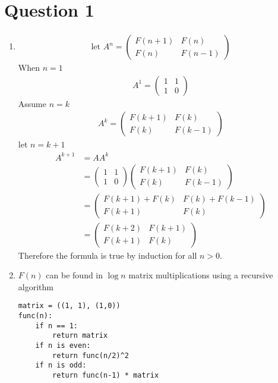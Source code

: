 \documentclass{article}
\begin{document}
\section*{Question 1}
\begin{enumerate}[label=\alph*)]
    \item
        \begin{gather}
            \text{let } A^n
            = \begin{pmatrix} F(n+1) & F(n) \\ F(n) & F(n-1)  \end{pmatrix}
        \end{gather}
        When $n = 1$
        \begin{gather}
            A^1 = \begin{pmatrix} 1 & 1 \\ 1 & 0 \end{pmatrix}
        \end{gather}
        Assume $n = k$
        \begin{gather}
            A^k = \begin{pmatrix} F(k+1) & F(k) \\ F(k) & F(k-1)  \end{pmatrix}
        \end{gather}
        let $n = k + 1$
        \begin{align}
            A^{k+1} &= AA^k \\
            &= \begin{pmatrix} 1 & 1 \\ 1 & 0 \end{pmatrix}\begin{pmatrix} F(k+1) & F(k) \\ F(k) & F(k-1)\end{pmatrix} \\
            &= \begin{pmatrix} F(k+1) + F(k) & F(k) + F(k-1) \\ F(k+1) & F(k)  \end{pmatrix} \\
            &= \begin{pmatrix} F(k+2) & F(k+1) \\ F(k+1) & F(k)  \end{pmatrix}
        \end{align}
        Therefore the formula is true by induction for all $n > 0$.
    \item
        $F(n)$ can be found in $\log n$ matrix multiplications using a recursive algorithm
        \begin{verbatim}
matrix = ((1, 1), (1,0))
func(n):
    if n == 1:
        return matrix
    if n is even:
        return func(n/2)^2
    if n is odd:
        return func(n-1) * matrix
        \end{verbatim}
\end{enumerate}
\end{document}
